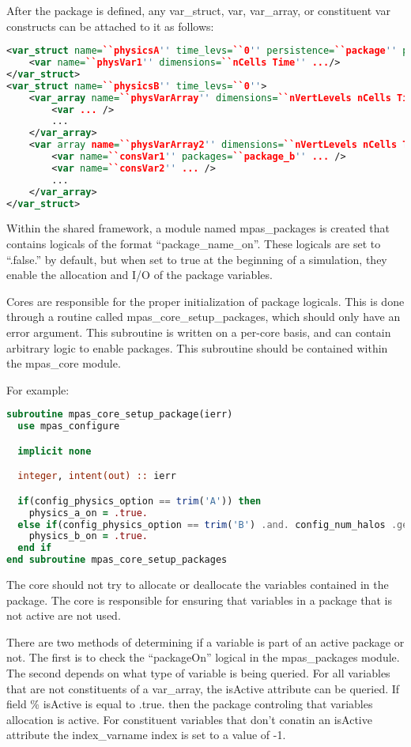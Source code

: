 \documentclass[11pt]{report}
\begin{document}
After the package is defined, any var\_struct, var, var\_array, or constituent
var constructs can be attached to it as follows:

{\scriptsize
\begin{lstlisting}[language=XML]
<var_struct name=``physicsA'' time_levs=``0'' persistence=``package'' packages=``package_a''>
	<var name=``physVar1'' dimensions=``nCells Time'' .../>
</var_struct>
<var_struct name=``physicsB'' time_levs=``0''>
	<var_array name=``physVarArray'' dimensions=``nVertLevels nCells Time'' persistence=``package'' packages=``package_b''>
		<var ... />
		...
	</var_array>
	<var array name=``physVarArray2'' dimensions=``nVertLevels nCells Time''>
		<var name=``consVar1'' packages=``package_b'' ... />
		<var name=``consVar2'' ... />
		...
	</var_array>
</var_struct>
\end{lstlisting}
}

Within the shared framework, a module named mpas\_packages is created that
contains logicals of the format ``package\_name\_on''. These logicals are set
to ``.false.'' by default, but when set to true at the beginning of a
simulation, they enable the allocation and I/O of the package variables. 

Cores are responsible for the proper initialization of package logicals. This
is done through a routine called mpas\_core\_setup\_packages, which should only have
an error argument. This subroutine is written on a per-core basis, and can
contain arbitrary logic to enable packages. This subroutine should be contained
within the mpas\_core module.

For example:
{\scriptsize
\begin{lstlisting}[language=Fortran]
subroutine mpas_core_setup_package(ierr)
  use mpas_configure

  implicit none

  integer, intent(out) :: ierr

  if(config_physics_option == trim('A')) then
    physics_a_on = .true.
  else if(config_physics_option == trim('B') .and. config_num_halos .ge. 3) then
    physics_b_on = .true.
  end if
end subroutine mpas_core_setup_packages
\end{lstlisting}
}

The core should not try to allocate or deallocate the variables contained in
the package. The core is responsible for ensuring that variables in a package
that is not active are not used.

There are two methods of determining if a variable is part of an active package
or not. The first is to check the ``packageOn'' logical in the
mpas\_packages module. The second depends on what type of variable is being
queried. For all variables that are not constituents of a var\_array, the
isActive attribute can be queried. If field \% isActive is equal to .true. then
the package controling that variables allocation is active. For constituent
variables that don't conatin an isActive attribute the index\_varname index is
set to a value of -1. 
\end{document}
